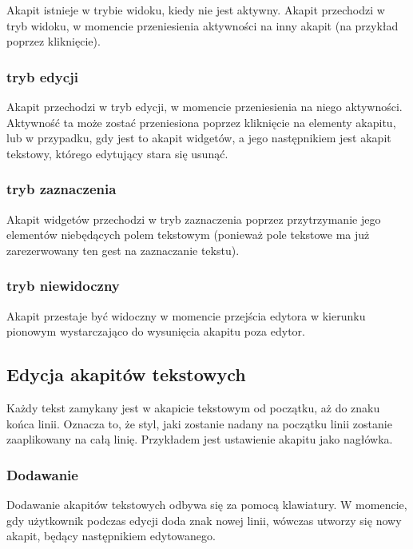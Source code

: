 Akapit istnieje w trybie widoku, kiedy nie jest aktywny.
Akapit przechodzi w tryb widoku, w momencie przeniesienia aktywności na inny akapit (na przykład poprzez kliknięcie).

\subsubsection{tryb edycji}

Akapit przechodzi w tryb edycji, w momencie przeniesienia na niego aktywności.
Aktywność ta może zostać przeniesiona poprzez kliknięcie na elementy akapitu, lub w przypadku, gdy jest to akapit widgetów, a jego następnikiem jest akapit tekstowy, którego edytujący stara się usunąć.

\subsubsection{tryb zaznaczenia}

Akapit widgetów przechodzi w tryb zaznaczenia poprzez przytrzymanie jego elementów niebędących polem tekstowym (ponieważ pole tekstowe ma już zarezerwowany ten gest na zaznaczanie tekstu).

\subsubsection{tryb niewidoczny}

Akapit przestaje być widoczny w momencie przejścia edytora w kierunku pionowym wystarczająco do wysunięcia akapitu poza edytor.

\pagebreak

\subsection{Edycja akapitów tekstowych}

Każdy tekst zamykany jest w akapicie tekstowym od początku, aż do znaku końca linii. Oznacza to, że styl, jaki zostanie nadany na początku linii zostanie zaaplikowany na całą linię. Przykładem jest ustawienie akapitu jako nagłówka.

\subsubsection{Dodawanie}

Dodawanie akapitów tekstowych odbywa się za pomocą klawiatury. W momencie, gdy użytkownik podczas edycji doda znak nowej linii, wówczas utworzy się nowy akapit, będący następnikiem edytowanego.

